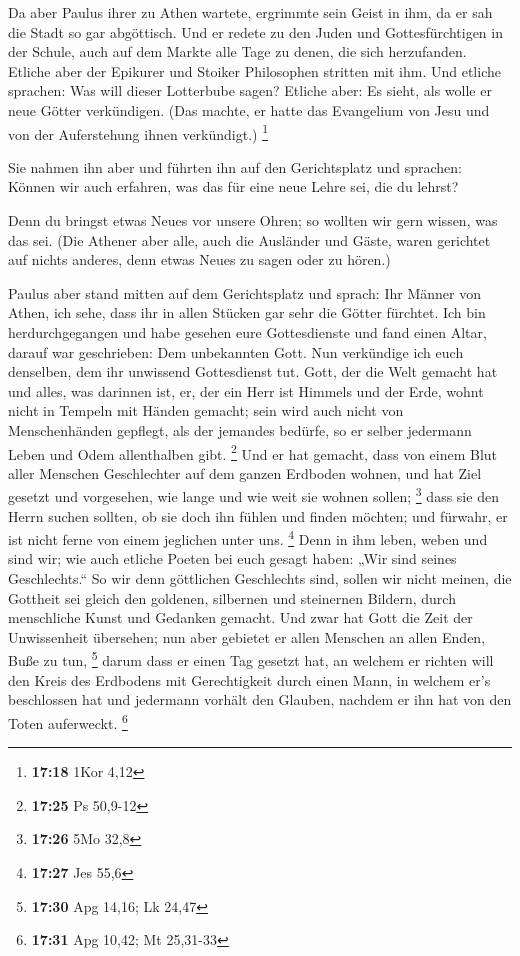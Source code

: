  Da aber Paulus ihrer zu Athen wartete, ergrimmte sein
Geist in ihm, da er sah die Stadt so gar abgöttisch.  Und
er redete zu den Juden und Gottesfürchtigen in der Schule, auch auf dem
Markte alle Tage zu denen, die sich herzufanden.  Etliche
aber der Epikurer und Stoiker Philosophen stritten mit ihm. Und etliche
sprachen: Was will dieser Lotterbube sagen? Etliche aber: Es sieht, als
wolle er neue Götter verkündigen. (Das machte, er hatte das Evangelium
von Jesu und von der Auferstehung ihnen verkündigt.) \footnote{\textbf{17:18}
  1Kor 4,12}

 Sie nahmen ihn aber und führten ihn auf den Gerichtsplatz
und sprachen: Können wir auch erfahren, was das für eine neue Lehre sei,
die du lehrst?

 Denn du bringst etwas Neues vor unsere Ohren; so wollten
wir gern wissen, was das sei.  (Die Athener aber alle, auch
die Ausländer und Gäste, waren gerichtet auf nichts anderes, denn etwas
Neues zu sagen oder zu hören.)

 Paulus aber stand mitten auf dem Gerichtsplatz und sprach:
Ihr Männer von Athen, ich sehe, dass ihr in allen Stücken gar sehr die
Götter fürchtet.  Ich bin herdurchgegangen und habe gesehen
eure Gottesdienste und fand einen Altar, darauf war geschrieben: Dem
unbekannten Gott. Nun verkündige ich euch denselben, dem ihr unwissend
Gottesdienst tut.  Gott, der die Welt gemacht hat und
alles, was darinnen ist, er, der ein Herr ist Himmels und der Erde,
wohnt nicht in Tempeln mit Händen gemacht;  sein wird auch
nicht von Menschenhänden gepflegt, als der jemandes bedürfe, so er
selber jedermann Leben und Odem allenthalben gibt. \footnote{\textbf{17:25}
  Ps 50,9-12}  Und er hat gemacht, dass von einem Blut
aller Menschen Geschlechter auf dem ganzen Erdboden wohnen, und hat Ziel
gesetzt und vorgesehen, wie lange und wie weit sie wohnen sollen;
\footnote{\textbf{17:26} 5Mo 32,8}  dass sie den Herrn
suchen sollten, ob sie doch ihn fühlen und finden möchten; und fürwahr,
er ist nicht ferne von einem jeglichen unter uns. \footnote{\textbf{17:27}
  Jes 55,6}  Denn in ihm leben, weben und sind wir; wie
auch etliche Poeten bei euch gesagt haben: „Wir sind seines
Geschlechts.``  So wir denn göttlichen Geschlechts sind,
sollen wir nicht meinen, die Gottheit sei gleich den goldenen, silbernen
und steinernen Bildern, durch menschliche Kunst und Gedanken gemacht.
 Und zwar hat Gott die Zeit der Unwissenheit übersehen; nun
aber gebietet er allen Menschen an allen Enden, Buße zu tun, \footnote{\textbf{17:30}
  Apg 14,16; Lk 24,47}  darum dass er einen Tag gesetzt
hat, an welchem er richten will den Kreis des Erdbodens mit
Gerechtigkeit durch einen Mann, in welchem er's beschlossen hat und
jedermann vorhält den Glauben, nachdem er ihn hat von den Toten
auferweckt. \footnote{\textbf{17:31} Apg 10,42; Mt 25,31-33}

